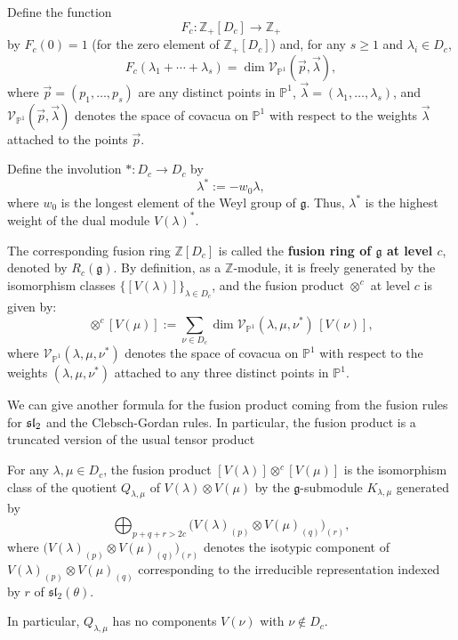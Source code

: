 \documentclass[12pt]{article}
\begin{document}
\begin{definition}
Define the function
\[
F_c:\mathbb{Z}_+[D_c]\to \mathbb{Z}_+
\]
by $F_c(0)=1$ (for the zero element of $\mathbb{Z}_+[D_c]$) and, for any $s\ge 1$ and $\lambda_i\in D_c$,
\[
F_c(\lambda_1+\cdots+\lambda_s)
=
\dim \mathcal V_{\mathbb P^1}(\vec p,\vec\lambda),
\]
where $\vec p=(p_1,\dots,p_s)$ are any distinct points in $\mathbb P^1$, $\vec\lambda=(\lambda_1,\dots,\lambda_s)$, and $\mathcal V_{\mathbb P^1}(\vec p,\vec\lambda)$ denotes the space of covacua on $\mathbb P^1$ with respect to the weights $\vec\lambda$ attached to the points $\vec p$. 

Define the involution $* : D_c\to D_c$ by
\[
\lambda^* := -w_0\lambda,
\]
where $w_0$ is the longest element of the Weyl group of $\mathfrak g$. Thus, $\lambda^*$ is the highest weight of the dual module $V(\lambda)^*$.
\end{definition}

The corresponding fusion ring $\mathbb{Z}[D_c]$ is called the \textbf{fusion ring of $\mathfrak g$ at level $c$}, denoted by $R_c(\mathfrak g)$. By definition, as a $\mathbb{Z}$-module, it is freely generated by the isomorphism classes $\{[V(\lambda)]\}_{\lambda\in D_c}$, and the fusion product $\otimes^c$ at level $c$ is given by:
\begin{equation}
[V(\lambda)]\otimes^c [V(\mu)]
:=
\sum_{\nu\in D_c}
\dim \mathcal V_{\mathbb P^1}(\lambda,\mu,\nu^*)\,[V(\nu)],
\end{equation}
where $\mathcal V_{\mathbb P^1}(\lambda,\mu,\nu^*)$ denotes the space of covacua on $\mathbb P^1$ with respect to the weights $(\lambda,\mu,\nu^*)$ attached to any three distinct points in $\mathbb P^1$.

We can give another formula for the fusion product coming from the fusion rules for $\sl_2$ and the Clebsch-Gordan rules. In particular, the fusion product is a truncated version of the usual tensor product

\begin{proposition}
For any $\lambda,\mu\in D_c$, the fusion product $[V(\lambda)]\otimes^c [V(\mu)]$
is the isomorphism class of the quotient $Q_{\lambda,\mu}$ of $V(\lambda)\otimes V(\mu)$
by the $\mathfrak g$-submodule $K_{\lambda,\mu}$ generated by
\[
\bigoplus_{p+q+r>2c}
\bigl( V(\lambda)_{(p)} \otimes V(\mu)_{(q)} \bigr)_{(r)},
\]
where $\bigl( V(\lambda)_{(p)} \otimes V(\mu)_{(q)} \bigr)_{(r)}$ denotes the isotypic component of
$V(\lambda)_{(p)} \otimes V(\mu)_{(q)}$ corresponding to the irreducible representation indexed by $r$
of $\mathfrak{sl}_2(\theta)$.

In particular, $Q_{\lambda,\mu}$ has no components $V(\nu)$ with $\nu\notin D_c$.
\end{proposition}
\end{document}
